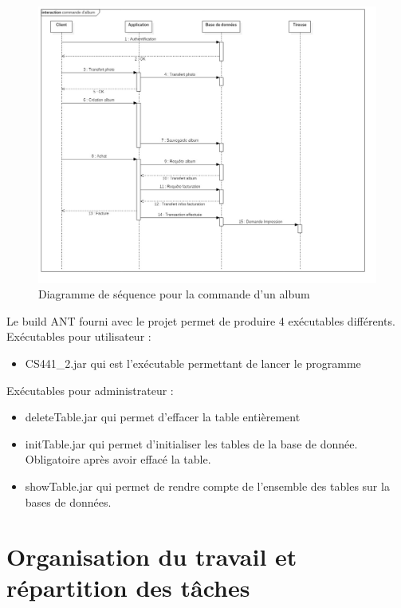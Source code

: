 \documentclass{article}
\begin{document}
\begin{flushleft}
\begin{figure}[!h]
  \begin{center}
    \includegraphics[scale=0.40]{fig8} %
    \caption{Diagramme de séquence pour la commande d'un album}
  \end{center}
\end{figure}

Le build ANT fourni avec le projet permet de produire 4 exécutables
différents.\\
Exécutables pour utilisateur : \\
\begin{itemize}
  \item CS441\_2.jar qui est l'exécutable permettant de lancer le programme
\end{itemize}
Exécutables pour administrateur :\\
\begin{itemize}
  \item deleteTable.jar qui permet d’effacer la table entièrement
  \item initTable.jar qui permet d’initialiser les tables de la base de donnée.
  Obligatoire après avoir effacé la table.
  \item showTable.jar qui permet de rendre compte de l’ensemble des tables
  sur la bases de données.
\end{itemize}

\newpage
\newpage
\section{Organisation du travail et répartition des tâches}


\end{flushleft}
\end{document}
